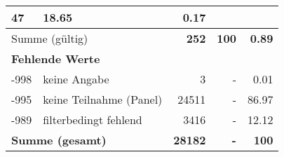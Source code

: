 \begin{longtable}{lXrrr}
       \num{47} &
       \num[round-mode=places,round-precision=2]{18.65} &
         \num[round-mode=places,round-precision=2]{0.17} \\
     \midrule
     \multicolumn{2}{l}{Summe (gültig)} &
       \textbf{\num{252}} &
     \textbf{\num{100}} &
       \textbf{\num[round-mode=places,round-precision=2]{0.89}} \\
     \multicolumn{5}{l}{\textbf{Fehlende Werte}}\\
       -998 &
       keine Angabe &
         \num{3} &
        - &
         \num[round-mode=places,round-precision=2]{0.01} \\
       -995 &
       keine Teilnahme (Panel) &
         \num{24511} &
        - &
         \num[round-mode=places,round-precision=2]{86.97} \\
       -989 &
       filterbedingt fehlend &
         \num{3416} &
        - &
         \num[round-mode=places,round-precision=2]{12.12} \\
     \midrule
     \multicolumn{2}{l}{\textbf{Summe (gesamt)}} &
          \textbf{\num{28182}} &
        \textbf{-} &
        \textbf{\num{100}} \\
     \bottomrule
     \end{longtable}
     
